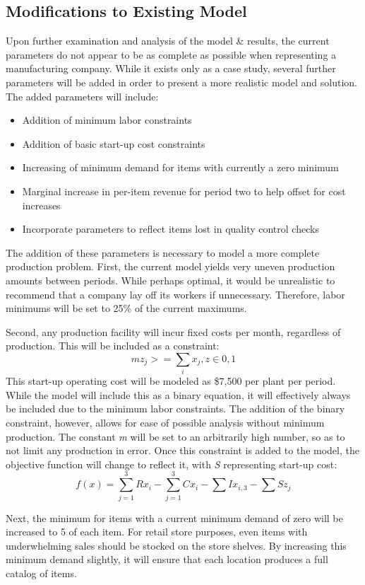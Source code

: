 \documentclass{article}
\begin{document}
\subsection{Modifications to Existing Model}
Upon further examination and analysis of the model \& results, the current parameters do not appear to be as complete as possible when representing a manufacturing company.  While it exists only as a case study, several further parameters will be added in order to present a more realistic model and solution.  The added parameters will include:
\begin{itemize}
	\item Addition of minimum labor constraints
	\item Addition of basic start-up cost constraints
	\item Increasing of minimum demand for items with currently a zero minimum
	\item Marginal increase in per-item revenue for period two to help offset for cost increases
	\item Incorporate parameters to reflect items lost in quality control checks
\end{itemize}
The addition of these parameters is necessary to model a more complete production problem.  First, the current model yields very uneven production amounts between periods.  While perhaps optimal, it would be unrealistic to recommend that a company lay off its workers if unnecessary.  Therefore, labor minimums will be set to 25\% of the current maximums.
\par
Second, any production facility will incur fixed costs per month, regardless of production.  This will be included as a constraint:
$$ mz_{j} >= \sum_{i} x_{j}, z\in {0,1} $$
This start-up operating cost will be modeled as \$7,500 per plant per period.  While the model will include this as a binary equation, it will effectively always be included due to the minimum labor constraints.  The addition of the binary constraint, however, allows for ease of possible analysis without minimum production.  The constant \textit{m} will be set to an arbitrarily high number, so as to not limit any production in error.  Once this constraint is added to the model, the objective function will change to reflect it, with \textit{S} representing start-up cost:
$$f(x) = \sum_{j=1}^{3}Rx_{i} - \sum_{j=1}^{3}Cx_{i} - \sum Ix_{i,3} -\sum Sz_{j}$$
\par
Next, the minimum for items with a current minimum demand of zero will be increased to 5 of each item.  For retail store purposes, even items with underwhelming sales should be stocked on the store shelves.  By increasing this minimum demand slightly, it will ensure that each location produces a full catalog of items.  
\end{document}
